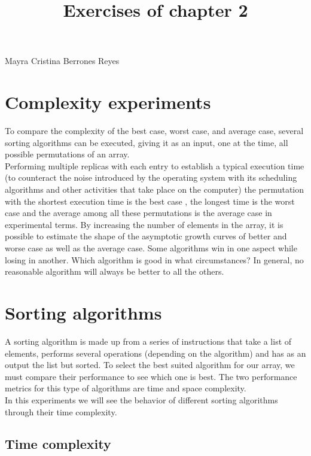 \documentclass{article}
\begin{document}
\title{Exercises of chapter 2}


\maketitle
Mayra Cristina Berrones Reyes

\section{Complexity experiments}

To compare the complexity of the best case, worst case, and average case, several sorting algorithms can be executed, giving it as an input, one at the time, all possible permutations of an array. \\

Performing multiple replicas with each entry to establish a typical execution time (to counteract the noise introduced by the operating system with its scheduling algorithms and other activities that take place on the computer) the permutation with the shortest execution time is the best case , the longest time is the worst case and the average among all these permutations is the average case in experimental terms. By increasing the number of elements in the array, it is possible to estimate the shape of the asymptotic growth curves of better and worse case as well as the average case. Some algorithms win in one aspect while losing in another. Which algorithm is good in what circumstances? In general, no reasonable algorithm will always be better to all the others.\\


\section{Sorting algorithms}

A sorting algorithm is made up from a series of instructions that take a list of elements, performs several operations (depending on the algorithm) and has as an output the list but sorted. To select the best suited algorithm for our array, we must compare their performance to see which one is best. The two performance metrics for this type of algorithms are time and space complexity. \\

In this experiments we will see the behavior of different sorting algorithms through their time complexity.\\

\subsection{Time complexity}
\end{document}
